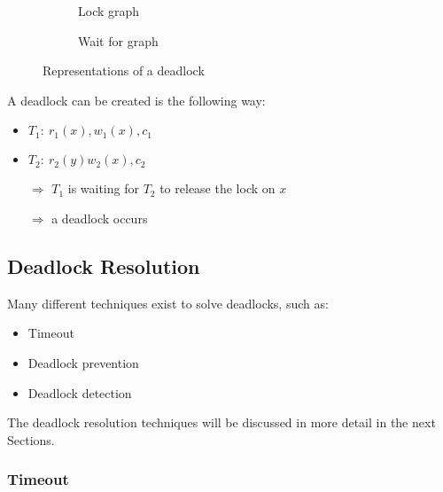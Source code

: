 \documentclass[english]{article}
\begin{document}
\begin{figure}[htbp]
  \centering
  \bigskip
  \begin{subfigure}[b]{0.495\textwidth}
    \centering
    \caption{Lock graph}
    \label{subfig:lock-graph}
  \end{subfigure}
  \bigskip
  \begin{subfigure}[b]{0.495\textwidth}
    \centering
    \caption{Wait for graph}
    \label{subfig:wait-for-graph}
  \end{subfigure}
  \bigskip
  \caption{Representations of a deadlock}
  \label{fig:deadlock-representations}
\end{figure}

\bigskip
A deadlock can be created is the following way:

\begin{minipage}{0.496\textwidth}
  \bigskip
  \begin{itemize}
    \item \(T_1: \ r_1(x), w_1(x), c_1\)
    \item \(T_2: \ r_2(y) w_2(x), c_2\)
    \item[\(\Rightarrow\)] \(T_1\) is waiting for \(T_2\) to release the lock on \(x\)
    \item[\(\Rightarrow\)] a deadlock occurs
  \end{itemize}
\end{minipage}
\begin{minipage}{0.496\textwidth}
  \centering
\end{minipage}

\subsection{Deadlock Resolution}

Many different techniques exist to solve deadlocks, such as:

\begin{itemize}
  \item Timeout
  \item Deadlock prevention
  \item Deadlock detection
\end{itemize}

The deadlock resolution techniques will be discussed in more detail in the next Sections.

\subsubsection{Timeout}
\end{document}
